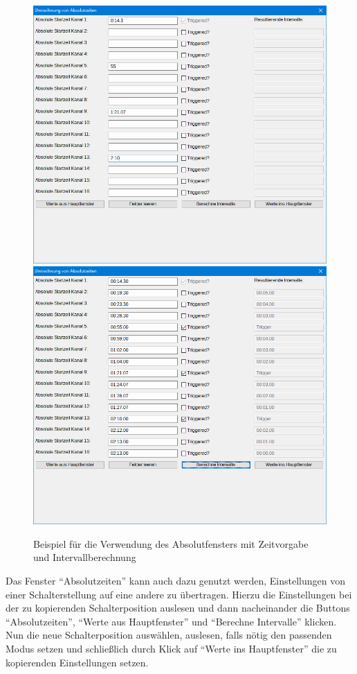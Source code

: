 \documentclass[paper=a4, open=any, numbers=noenddot]{scrbook}
\begin{document}
				\begin{figure}[tb]
					\begin{center}\includegraphics[width=.8\textwidth]{beispielzeitvorgabe}{\\}\includegraphics[width=.8\textwidth]{beispielabsolut}\end{center}
					\caption{Beispiel für die Verwendung des Absolutfensters mit Zeitvorgabe und Intervallberechnung}
					\label{fig:beispielabsolut}
				\end{figure}

				Das Fenster \enquote{Absolutzeiten} kann auch dazu genutzt werden, Einstellungen von einer Schalterstellung auf eine andere zu übertragen. Hierzu die Einstellungen bei der zu kopierenden Schalterposition auslesen und dann nacheinander die Buttons \enquote{Absolutzeiten}, \enquote{Werte aus Hauptfenster} und \enquote{Berechne Intervalle} klicken. Nun die neue Schalterposition auswählen, auslesen, falls nötig den passenden Modus setzen und schließlich durch Klick auf \enquote{Werte ins Hauptfenster} die zu kopierenden Einstellungen setzen.
\end{document}
